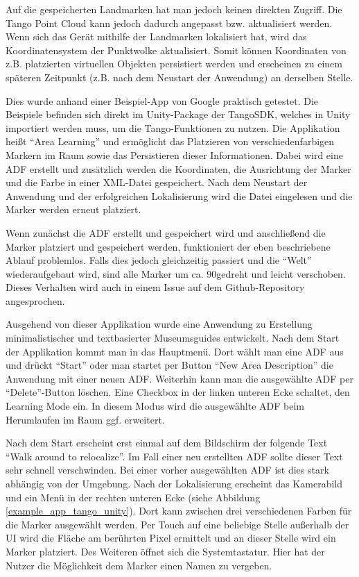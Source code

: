 Auf die gespeicherten Landmarken hat man jedoch keinen direkten Zugriff. Die Tango Point Cloud kann jedoch dadurch angepasst bzw. aktualisiert werden. Wenn sich das Gerät mithilfe der Landmarken lokalisiert hat, wird das Koordinatensystem der Punktwolke aktualisiert. Somit können Koordinaten von z.B. platzierten virtuellen Objekten persistiert werden und erscheinen zu einem späteren Zeitpunkt (z.B. nach dem Neustart der Anwendung) an derselben Stelle.

Dies wurde anhand einer Beispiel-App von Google praktisch getestet. Die Beispiele befinden sich direkt im Unity-Package der TangoSDK, welches in Unity importiert werden muss, um die Tango-Funktionen zu nutzen. Die Applikation heißt "`Area Learning"' und ermöglicht das Platzieren von verschiedenfarbigen Markern im Raum sowie das Persistieren dieser Informationen. Dabei wird eine ADF erstellt und zusätzlich werden die Koordinaten, die Ausrichtung der Marker und die Farbe in einer XML-Datei gespeichert. Nach dem Neustart der Anwendung und der erfolgreichen Lokalisierung wird die Datei eingelesen und die Marker werden erneut platziert.

Wenn zunächst die ADF erstellt und gespeichert wird und anschließend die Marker platziert und gespeichert werden, funktioniert der eben beschriebene Ablauf problemlos. Falls dies jedoch gleichzeitig passiert und die "`Welt"' wiederaufgebaut wird, sind alle Marker um ca. 90\degree gedreht und leicht verschoben. Dieses Verhalten wird auch in einem Issue auf dem Github-Repository angesprochen\cite{tango_unity_github_issue100}.

Ausgehend von dieser Applikation wurde eine Anwendung zu Erstellung minimalistischer und textbasierter Museumsguides entwickelt. Nach dem Start der Applikation kommt man in das Hauptmenü. Dort wählt man eine ADF aus und drückt "`Start"' oder man startet per Button "`New Area Description"' die Anwendung mit einer neuen ADF. Weiterhin kann man die ausgewählte ADF per "`Delete"'-Button löschen. Eine Checkbox in der linken unteren Ecke schaltet, den Learning Mode ein. In diesem Modus wird die ausgewählte ADF beim Herumlaufen im Raum ggf. erweitert.

Nach dem Start erscheint erst einmal auf dem Bildschirm der folgende Text "`Walk around to relocalize"'. Im Fall einer neu erstellten ADF sollte dieser Text sehr schnell verschwinden. Bei einer vorher ausgewählten ADF ist dies stark abhängig von der Umgebung. Nach der Lokalisierung erscheint das Kamerabild und ein Menü in der rechten unteren Ecke (siehe Abbildung \ref{example_app_tango_unity}). Dort kann zwischen drei verschiedenen Farben für die Marker ausgewählt werden. Per Touch auf eine beliebige Stelle außerhalb der UI wird die Fläche am berührten Pixel ermittelt und an dieser Stelle wird ein Marker platziert. Des Weiteren öffnet sich die Systemtastatur. Hier hat der Nutzer die Möglichkeit dem Marker einen Namen zu vergeben.

